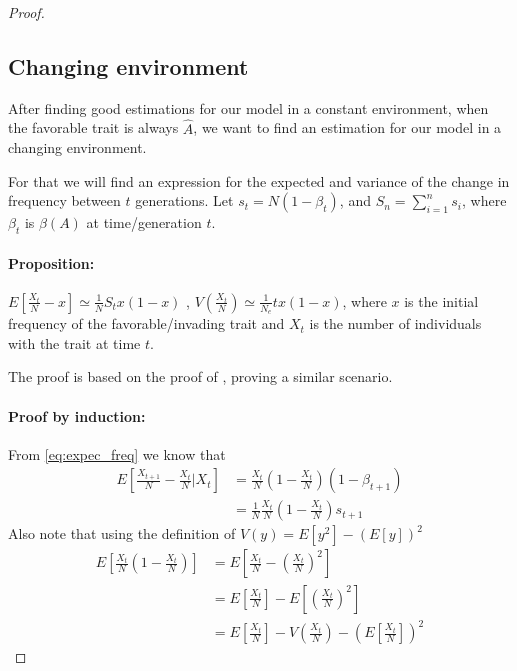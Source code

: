 \documentclass[12pt]{extarticle}
\begin{document}
\begin{proof}
\subsection*{Changing environment}
After finding good estimations for our model in a constant environment, when the favorable trait is always $\hat{A}$, we want to find an estimation for our model in a changing environment.

For that we will find an expression for the expected and variance of the change in frequency between $t$ generations.
Let $s_t=N(1-\beta_t)$, and $S_n=\sum\limits_{i=1}^n s_i$, where $\beta_t$ is $\beta(A)$ at time/generation $t$.


\paragraph{Proposition:} $E[\frac{X_t}{N}-x]\simeq \frac{1}{N}S_tx(1-x)$ , $V(\frac{X_t}{N})\simeq\frac{1}{N_e}tx(1-x)$, where $x$ is the initial frequency of the favorable/invading trait and $X_t$ is the number of individuals with the trait at time $t$.

The proof is based on the proof of \citet{changeEnv}, proving a similar scenario.
\paragraph{Proof by induction:}
From \cref{eq:expec_freq} we know that
\begin{equation}\label{eq:ch_1}
\begin{split}
E\left[\frac{X_{t+1}}{N}-\frac{X_t}{N}\bigg|X_t\right] &= \frac{X_t}{N}\left(1-\frac{X_t}{N}\right)(1-\beta_{t+1}) \\
&= \frac{1}{N}\frac{X_t}{N}\left(1-\frac{X_t}{N}\right)s_{t+1}
\end{split}
\end{equation}
Also note that using the definition of $V(y)=E[y^2]-(E[y])^2$
\begin{equation}
\begin{split}
E\left[\frac{X_t}{N}\left(1-\frac{X_t}{N}\right)\right] &= E\left[\frac{X_t}{N}-\left(\frac{X_t}{N}\right)^2\right] \\
&= E\left[\frac{X_t}{N}\right]-E\left[\left(\frac{X_t}{N}\right)^2\right] \\
&= E\left[\frac{X_t}{N}\right] - V\left(\frac{X_t}{N}\right) - \left(E\left[\frac{X_t}{N}\right]\right)^2
\end{split}
\end{equation}


\end{proof}
\end{document}
